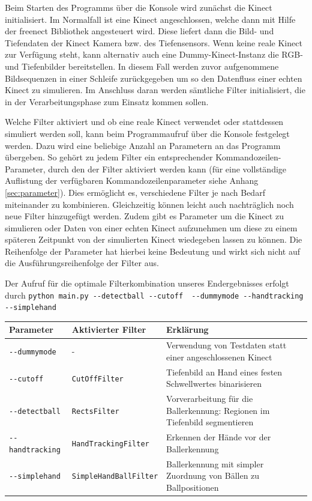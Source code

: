 \documentclass[12pt,a4paper,ngerman]{scrartcl}
\begin{document}
Beim Starten des Programms über die Konsole wird zunächst die Kinect initialisiert.
Im Normalfall ist eine Kinect angeschlossen, welche dann mit Hilfe der freenect Bibliothek \cite{libfreenect} angesteuert wird. Diese liefert dann die Bild- und Tiefendaten der Kinect Kamera bzw. des Tiefensensors. Wenn keine reale Kinect zur Verfügung steht, kann alternativ auch eine Dummy-Kinect-Instanz die RGB- und Tiefenbilder bereitstellen. In diesem Fall werden zuvor aufgenommene Bildsequenzen in einer Schleife zurückgegeben um so den Datenfluss einer echten Kinect zu simulieren.
Im Anschluss daran werden sämtliche Filter initialisiert, die in der Verarbeitungsphase zum Einsatz kommen sollen.

Welche Filter aktiviert und ob eine reale Kinect verwendet oder stattdessen simuliert werden soll, kann beim Programmaufruf über die Konsole festgelegt werden. Dazu wird eine beliebige Anzahl an Parametern an das Programm übergeben. So gehört zu jedem Filter ein entsprechender Kommandozeilen-Parameter, durch den der Filter aktiviert werden kann (für eine vollständige Auflistung der verfügbaren Kommandozeilenparameter  siehe Anhang \ref{sec:parameter}). Dies ermöglicht es, verschiedene Filter je nach Bedarf miteinander zu kombinieren. Gleichzeitig können leicht auch nachträglich noch neue Filter hinzugefügt werden. Zudem gibt es Parameter um die Kinect zu simulieren oder Daten von einer echten Kinect aufzunehmen um diese zu einem späteren Zeitpunkt von der simulierten Kinect wiedegeben lassen zu können. Die Reihenfolge der Parameter hat hierbei keine Bedeutung und wirkt sich nicht auf die Ausführungsreihenfolge der Filter aus.

Der Aufruf für die optimale Filterkombination unseres Endergebnisses erfolgt durch \lstinline{python main.py --detectball --cutoff  --dummymode --handtracking --simplehand}

\begin{tabular}{llp{8cm}}
Parameter & Aktivierter Filter & Erklärung \\ \hline
{\lstinline!--dummymode!} & - & Verwendung von Testdaten statt einer angeschlossenen Kinect \\
{\lstinline!--cutoff!} & {\lstinline!CutOffFilter!} & Tiefenbild an Hand eines festen Schwellwertes binarisieren \\
{\lstinline!--detectball!} & {\lstinline!RectsFilter!} & Vorverarbeitung für die Ballerkennung: Regionen im Tiefenbild segmentieren \\
{\lstinline!--handtracking!} & {\lstinline!HandTrackingFilter!} & Erkennen der Hände vor der Ballerkennung \\
{\lstinline!--simplehand!} & {\lstinline!SimpleHandBallFilter!} & Ballerkennung mit simpler Zuordnung von Bällen zu Ballpositionen
\end{tabular}
\end{document}
